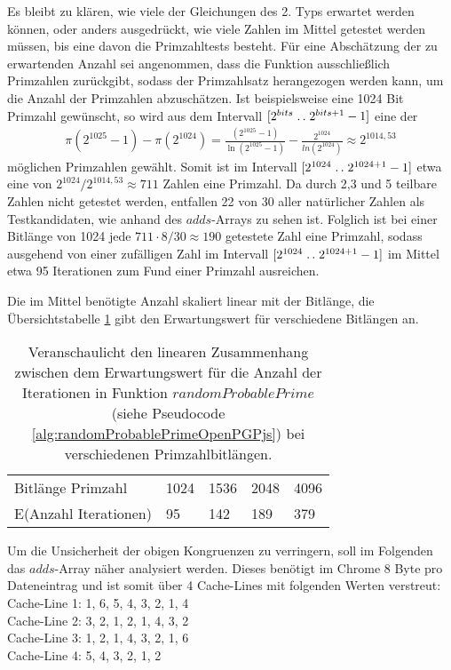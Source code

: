 Es bleibt zu klären, wie viele der Gleichungen des 2. Typs erwartet werden können, oder anders ausgedrückt, wie viele Zahlen im Mittel getestet werden müssen, bis eine davon die Primzahltests besteht. 
Für eine Abschätzung der zu erwartenden Anzahl sei angenommen, dass die Funktion ausschließlich Primzahlen zurückgibt, sodass der Primzahlsatz herangezogen werden kann, um die Anzahl der Primzahlen abzuschätzen.
Ist beispielsweise eine 1024 Bit Primzahl gewünscht, so wird aus dem Intervall $[2^{bits}\mathrel{{.}\,{.}}\nobreak 2^{bits+1}-1]$ eine der \begin{align}
\pi(2^{1025}-1) - \pi(2^{1024}) = \frac{(2^{1025}-1)}{\ln(2^{1025}-1)} - \frac{2^{1024}}{ln(2^{1024})} \approx 2^{1014,53}
\end{align}
möglichen Primzahlen gewählt.
Somit ist im Intervall $[2^{1024}\mathrel{{.}\,{.}}\nobreak 2^{1024+1}-1]$ etwa eine von $2^{1024}/2^{1014,53} \approx 711$ Zahlen eine Primzahl.
Da durch 2,3 und 5 teilbare Zahlen nicht getestet werden, entfallen 22 von 30 aller natürlicher Zahlen als Testkandidaten, wie anhand des $adds$-Arrays zu sehen ist.
Folglich ist bei einer Bitlänge von 1024 jede $711 \cdot 8/30 \approx 190$ getestete Zahl eine Primzahl, sodass ausgehend von einer zufälligen Zahl im Intervall $[2^{1024}\mathrel{{.}\,{.}}\nobreak 2^{1024+1}-1]$ im Mittel etwa 95 Iterationen zum Fund einer Primzahl ausreichen.

Die im Mittel benötigte Anzahl skaliert linear mit der Bitlänge, die Übersichtstabelle \ref{tbl:bitLengthNumberOfIterations} gibt den Erwartungswert für verschiedene Bitlängen an.

\begin{table}[h]
\caption{Veranschaulicht den linearen Zusammenhang zwischen dem Erwartungswert für die Anzahl der Iterationen in Funktion $randomProbablePrime$ (siehe Pseudocode \ref{alg:randomProbablePrimeOpenPGPjs}) bei verschiedenen Primzahlbitlängen.}
\label{tbl:bitLengthNumberOfIterations}
\begin{tabular}{lllll}
Bitlänge Primzahl     & 1024 & 1536 & 2048 & 4096 \\
E(Anzahl Iterationen) & 95   & 142  & 189  & 379 
\end{tabular}
\end{table}

Um die Unsicherheit der obigen Kongruenzen zu verringern, soll im Folgenden das $adds$-Array näher analysiert werden.
Dieses benötigt im Chrome 8 Byte pro Dateneintrag und ist somit über 4 Cache-Lines mit folgenden Werten verstreut:\\
Cache-Line 1: 1, 6, 5, 4, 3, 2, 1, 4\\
Cache-Line 2: 3, 2, 1, 2, 1, 4, 3, 2\\
Cache-Line 3: 1, 2, 1, 4, 3, 2, 1, 6\\
Cache-Line 4: 5, 4, 3, 2, 1, 2

